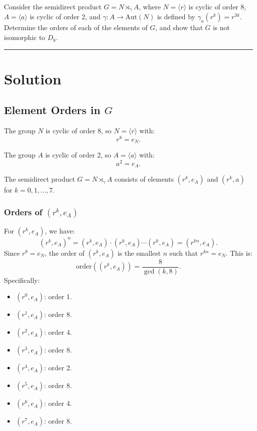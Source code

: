 \documentclass[12pt]{amsart}
\theoremstyle{definition}
\numberwithin{equation}{section}
\begin{document}
\begin{exercise}{5} Consider the semidirect product \(G = N \rtimes_\gamma A\), where \(N = \langle r \rangle\) is cyclic of order 8, \(A = \langle a \rangle\) is cyclic of order 2, and \(\gamma: A \rightarrow \text{Aut}(N)\) is defined by \(\gamma_a(r^k)=r^{3k}\). Determine the orders of each of the elements of $G$, and show that $G$ is not isomorphic to \(D_8\).

    \noindent\rule{\linewidth}{1pt}

    \section*{Solution}

    \subsection*{Element Orders in \(G\)}

    The group \(N\) is cyclic of order 8, so \(N = \langle r \rangle\) with:
    \[
    r^8 = e_N.
    \]

    The group \(A\) is cyclic of order 2, so \(A = \langle a \rangle\) with:
    \[
    a^2 = e_A.
    \]

    The semidirect product \(G = N \rtimes_\gamma A\) consists of elements \((r^k, e_A)\) and \((r^k, a)\) for \(k = 0, 1, \ldots, 7\).

    \subsubsection*{Orders of \((r^k, e_A)\)}

    For \((r^k, e_A)\), we have:
    \[
    (r^k, e_A)^n = (r^k, e_A) \cdot (r^k, e_A) \cdots (r^k, e_A) = (r^{kn}, e_A).
    \]
    Since \(r^8 = e_N\), the order of \((r^k, e_A)\) is the smallest \(n\) such that \(r^{kn} = e_N\). This is:
    \[
    \text{order}((r^k, e_A)) = \frac{8}{\gcd(k, 8)}.
    \]
    Specifically:
    \begin{itemize}
        \item \((r^0, e_A)\): order 1.
        \item \((r^1, e_A)\): order 8.
        \item \((r^2, e_A)\): order 4.
        \item \((r^3, e_A)\): order 8.
        \item \((r^4, e_A)\): order 2.
        \item \((r^5, e_A)\): order 8.
        \item \((r^6, e_A)\): order 4.
        \item \((r^7, e_A)\): order 8.
    \end{itemize}


\end{exercise}
\end{document}
